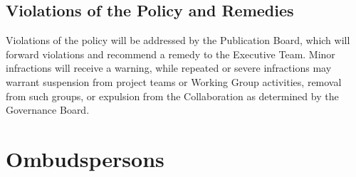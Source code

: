 \documentclass[12pt]{article}
\begin{document}
\subsection{Violations of the Policy and Remedies}
Violations of the policy will be addressed by the Publication Board, which will forward violations and recommend a remedy to the Executive Team.  Minor infractions will receive a warning, while repeated or severe infractions may warrant suspension from project teams or Working Group activities, removal from such groups, or expulsion from the Collaboration as determined by the Governance Board.


\section{Ombudspersons}
\end{document}
